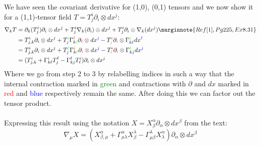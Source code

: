 \documentclass[10pt]{article}
\begin{document}
We have seen the covariant derivative for (1,0), (0,1) tensors and we now show it for a (1,1)-tensor field $T=T_j^i\partial_i\otimes dx^j$:
$$
\begin{aligned}
	\nabla_k T &= \partial_k(T_j^i)\partial_i\otimes dx^j + T_j^i\nabla_k(\partial_i)\otimes dx^j+ T_j^i\partial_i\otimes \nabla_k(dx^j)\marginnote{Ref [1], Pg 225, Ex 8.31}\\
	&= T_{j,k}^i\partial_i\otimes dx^j + T_{\textcolor{blue}j}^{\textcolor{green}i}\Gamma_{k{\textcolor{green}i}}^{\textcolor{red}\ell}\partial_{\textcolor{red}\ell}\otimes dx^{\textcolor{blue}j}- T_{\textcolor{green}j}^{\textcolor{red}i}\partial_{\textcolor{red}i}\otimes \Gamma_{k{\textcolor{blue}\ell}}^{\textcolor{green}j}dx^{\textcolor{blue}\ell}\\
	&= T_{j,k}^i\partial_i\otimes dx^j + T_{\textcolor{blue}j}^{\textcolor{green}\ell}\Gamma_{k{\textcolor{green}\ell}}^{\textcolor{red}i}\partial_{\textcolor{red}i}\otimes dx^{\textcolor{blue}j}- T_{\textcolor{green}\ell}^{\textcolor{red}i}\partial_{\textcolor{red}i}\otimes \Gamma_{k{\textcolor{blue}j}}^{\textcolor{green}\ell}dx^{\textcolor{blue}j}\\
	&= (T_{j,k}^i + \Gamma_{k{\ell}}^{i}T_{j}^{\ell} - \Gamma_{k{j}}^{\ell}T_{\ell}^{i})\partial_i\otimes dx^j
\end{aligned}
$$
Where we go from step 2 to 3 by relabelling indices in such a way that the internal contraction marked in \textcolor{green}{green} and contractions with $\partial$ and $dx$ marked in \textcolor{red}{red} and \textcolor{blue}{blue} respectively remain the same. After doing this we can factor out the tensor product.\\\\
Expressing this result using the notation $X=X_\beta^\alpha\partial_\alpha\otimes dx^\beta$ from the text:
$$
	\nabla_\mu X = (X_{\beta,\mu}^\alpha+\Gamma_{\mu\lambda}^\alpha X_\beta^\lambda-\Gamma_{\mu\beta}^\lambda X_\lambda^\alpha)\partial_\alpha\otimes dx^\beta
$$
\end{document}
